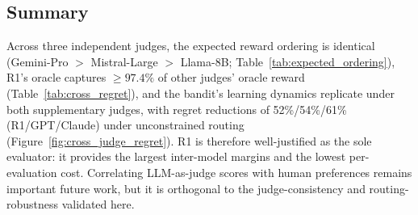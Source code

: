 \subsection{Summary}

Across three independent judges, the expected reward ordering is
identical (Gemini-Pro $>$ Mistral-Large $>$ Llama-8B;
Table~\ref{tab:expected_ordering}), R1's oracle captures
${\geq}97.4\%$ of other judges' oracle reward
(Table~\ref{tab:cross_regret}), and the bandit's learning dynamics
replicate under both supplementary judges, with regret reductions of
52\%/54\%/61\% (R1/GPT/Claude) under unconstrained routing
(Figure~\ref{fig:cross_judge_regret}).  R1 is therefore well-justified
as the sole evaluator: it provides the largest inter-model margins and
the lowest per-evaluation cost.  Correlating LLM-as-judge scores with
human preferences remains important future work, but it is orthogonal
to the judge-consistency and routing-robustness validated here.
